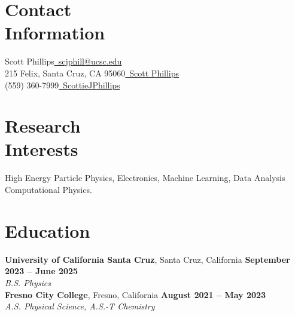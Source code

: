 \documentclass[margin,line]{resume}
\let\origsection\section%
\let\section\subsection%
\let\section\origsection%
\begin{document}
\begin{resume}

\section{\mysidestyle Contact\\Information}

Scott Phillips\hfill \href{mailto:scjphill@ucsc.edu}{~scjphill@ucsc.edu}
\vspace{0mm}\\\vspace{0mm}%
215 Felix, Santa Cruz, CA 95060\hfill  \href{https://www.linkedin.com/in/scott-phillips-438583176/}{~Scott Phillips}
\vspace{0mm}\\\vspace{0mm}%
(559) 360-7999\hfill \href{https://github.com/ScottieJPhillips}{~ScottieJPhillips}
\vspace{0mm}\\\vspace{0mm}%
\vspace{-6.5mm}%

\section{\mysidestyle Research\\Interests}
{\small
High Energy Particle Physics, Electronics, Machine Learning, Data Analysis\\Computational Physics.
}
\section{\mysidestyle Education}

\textbf{University of California Santa Cruz}, Santa Cruz, California \hfill \textbf{September 2023 -- June 2025}\\
\textsl{B.S. Physics}\\

\textbf{Fresno City College}, Fresno, California \hfill \textbf{August 2021 -- May 2023}\\
\textsl{A.S. Physical Science, A.S.-T Chemistry}
%
%


\end{resume}
\end{document}
